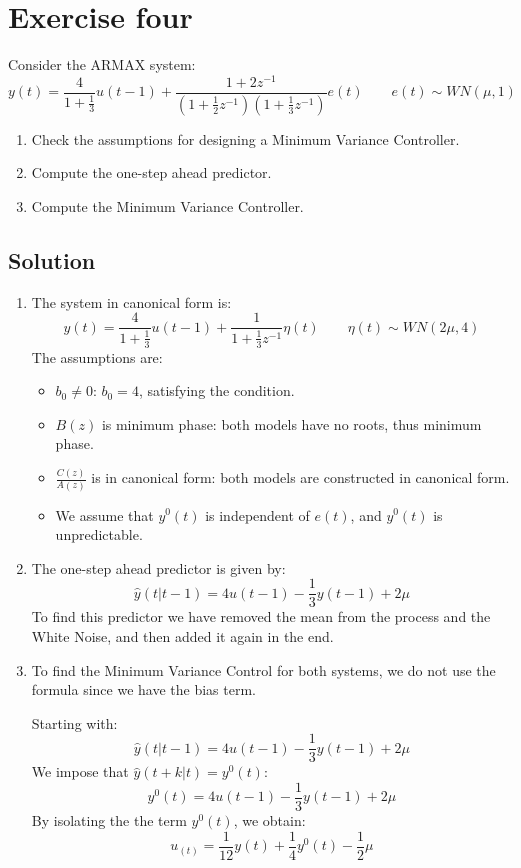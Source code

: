 \section{Exercise four}

Consider the ARMAX system: 
\[y(t)=\dfrac{4}{1+\frac{1}{3}}u(t-1)+\dfrac{1+2z^{-1}}{\left(1+\frac{1}{2}z^{-1}\right)\left(1+\frac{1}{3}z^{-1}\right)}e(t) \qquad e(t)\sim WN(\mu,1)\]
\begin{enumerate}
    \item Check the assumptions for designing a Minimum Variance Controller.
    \item Compute the one-step ahead predictor.
    \item Compute the Minimum Variance Controller.
\end{enumerate}

\subsection*{Solution}
\begin{enumerate}
    \item The system in canonical form is:
        \[y(t)=\dfrac{4}{1+\frac{1}{3}}u(t-1)+\dfrac{1}{1+\frac{1}{3}z^{-1}}\eta(t) \qquad \eta(t)\sim WN(2\mu,4)\]
        The assumptions are:
        \begin{itemize}
            \item $b_0\neq 0$: $b_0=4$, satisfying the condition.
            \item $B(z)$ is minimum phase: both models have no roots, thus minimum phase.
            \item $\frac{C(z)}{A(z)}$ is in canonical form: both models are constructed in canonical form.
            \item We assume that $y^0(t)$ is independent of $e(t)$, and $y^0(t)$ is unpredictable. 
        \end{itemize}
    \item The one-step ahead predictor is given by:
        \[\hat{y}(t|t-1)=4u(t-1)-\dfrac{1}{3}y(t-1)+2\mu\]
        To find this predictor we have removed the mean from the process and the White Noise, and then added it again in the end. 
    \item To find the Minimum Variance Control for both systems, we do not use the formula since we have the bias term. 

        Starting with:
        \[\hat{y}(t|t-1)=4u(t-1)-\dfrac{1}{3}y(t-1)+2\mu\]
        We impose that $\hat{y}(t+k|t)=y^0(t)$: 
        \[y^0(t)=4u(t-1)-\dfrac{1}{3}y(t-1)+2\mu\]
        By isolating the the term $y^0(t)$, we obtain:
        \[u_(t)=\dfrac{1}{12}y(t)+\dfrac{1}{4}y^0(t)-\dfrac{1}{2}\mu\]
\end{enumerate}